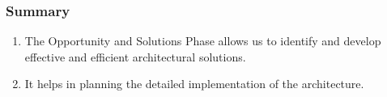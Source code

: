 \documentclass[aspectratio=169, table]{beamer}
\begin{document}
	
	\begin{frame}
		\frametitle{Summary}
		\begin{enumerate}
			\item The Opportunity and Solutions Phase allows us to identify and develop effective and efficient architectural solutions. 
			\item It helps in planning the detailed implementation of the architecture.
		\end{enumerate}
	\end{frame}
	
\end{document}
